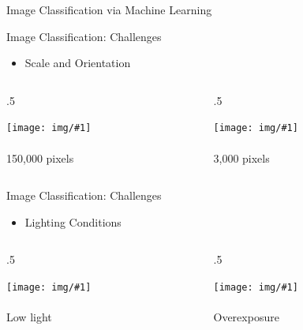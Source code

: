 \documentclass{beamer}
\newcommand{\ImageAndCaptionColumn}[2]{%
    \begin{column}{.5\textwidth}
        \begin{center} 
            \texttt{[image: img/\#1]} \\~\\ 
            {\Large #2}
        \end{center} 
    \end{column}
}
\newcommand{\TextAndTwoImageFrame}[5]{%
    \vspace{-0.5cm}    
    
    \begin{itemize}
        \item #1
    \end{itemize}
    
    \vspace{-0.5cm} %
    
    \begin{columns}[T]
        \ImageAndCaptionColumn{#2}{#3}
        \ImageAndCaptionColumn{#4}{#5}
    \end{columns}
}
\newcommand{\HorizArrow}[3]{%
    \path [->, primaryRed, ultra thick] (#1,#3) edge (#2,#3);
}
\newcommand{\VertArrow}[3]{%
    \path [->, primaryRed, ultra thick] (#1,#2) edge (#1,#3);
}
\newcommand{\HorizGreyArrow}[3]{%
    \path [->, edgeGrey, ultra thick] (#1,#3) edge (#2,#3);
}
\begin{document}
\begin{frame}{Image Classification via Machine Learning}
{{
    }}

\end{frame}

\begin{frame}{Image Classification: Challenges}


    \TextAndTwoImageFrame{
    	Scale and Orientation
    }{size2}{150,000 pixels}{size1}{3,000 pixels}
    
\end{frame}


\begin{frame}{Image Classification: Challenges}


\TextAndTwoImageFrame{
        Lighting Conditions
    }{light1}{Low light}{light2}{Overexposure}

\end{frame}
\end{document}
